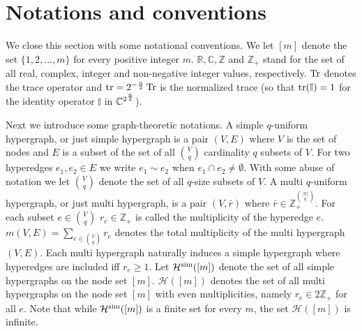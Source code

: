 \documentclass[12pt]{article}
\newcommand{\C}{\mathbb{C}}
\newcommand{\R}{\mathbb{R}}
\newcommand{\Z}{\mathbb{Z}}
\newcommand{\cH}{\mathcal{H}}
\newcommand{\id}{\mathbb{I}}
\begin{document}
\section*{Notations and conventions}
We close this section with some notational conventions. We let $[m]$ denote the set $\{1,2,\ldots,m\}$ for every positive integer $m$.
$\R,\C,\Z$ and $\Z_+$ stand for  the set of all real, complex, integer and non-negative integer values, respectively. 
$\Tr$ denotes the trace operator and $\tr=2^{-{n\over 2}}\Tr$ is the normalized trace (so that $\tr(\id)=1$ for the identity operator $\id$ in $\C^{2^{n\over 2}}$). 

Next we introduce some graph-theoretic notations.
A simple $q$-uniform hypergraph, or just simple hypergraph is a pair $(V,E)$ where $V$ is the set of nodes and $E$ is a  subset of the set of 
all ${V \choose q}$ cardinality $q$ subsets of $V$. 
For two hyperedges $e_1,e_2\in E$ we  write $e_1\sim e_2$ when $e_1\cap e_2\ne \emptyset$.
With some abuse of notation we let $\binom{V}{q}$ denote the set of all $q$-size subsets of $V$.
A multi $q$-uniform hypergraph, or just multi hypergraph, is a pair $(V,\bar r)$ where $\bar r\in \Z_+^{|V| \choose q}$. For each subset $e\in \binom{V}{q}$ 
$r_e\in \Z_+$ is called the multiplicity of the hyperedge $e$. $m(V,E)=\sum_{e\in \binom{V}{q}} r_e$ denotes the total multiplicity of the
multi hypergraph $(V,E)$.
Each multi hypergraph naturally induces a simple hypergraph where hyperedges are included
iff $r_e\ge 1$. Let $\cH^{\rm sim}([m])$ denote the set of all simple hypergraphs on the node set $[m]$. 
$\cH([m])$ denotes the  set of all multi hypergraphs on the node set $[m]$ with even  multiplicities, namely $r_e\in 2\Z_+$ for all $e$. 
Note that while $\cH^{\rm sim}([m])$ is a finite set for every $m$, the set $\cH([m])$ is infinite. 
\end{document}
